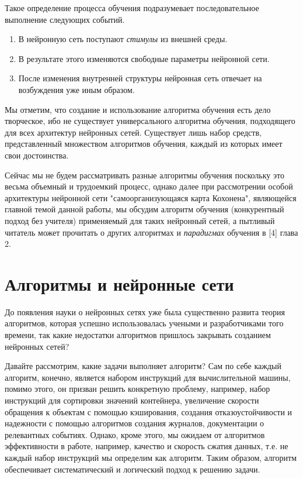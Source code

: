 \documentclass[a4paper,12pt]{report}
\begin{document}
Такое определение процесса обучения подразумевает последовательное
выполнение следующих событий.
\begin{enumerate}
    \item В нейронную сеть поступают \textit{стимулы} из внешней
        среды.
    \item В результате этого изменяются свободные параметры нейронной
        сети.
    \item После изменения внутренней структуры нейронная сеть отвечает
        на возбуждения уже иным образом.
\end{enumerate}

Мы отметим, что создание и использование алгоритма обучения есть дело
творческое, ибо не существует универсального алгоритма обучения,
подходящего для всех архитектур нейронных сетей. Существует лишь набор
средств, представленный множеством алгоритмов обучения, каждый из
которых имеет свои достоинства.

Сейчас мы не будем рассматривать разные алгоритмы обучения поскольку
это весьма объемный и трудоемкий процесс, однако далее при
рассмотрении особой архитектуры нейронной сети "самоорганизующаяся
карта Кохонена", являющейся главной темой данной работы, мы обсудим
алгоритм обучения (конкурентный подход без учителя) применяемый для
таких нейронный сетей, а пытливый читатель может прочитать о других
алгоритмах и \textit{парадигмах}
обучения в [4] глава 2.

\section{Алгоритмы и нейронные сети}
До появления науки о нейронных сетях уже была существенно развита
теория алгоритмов, которая успешно использовалась учеными и
разработчиками того времени, так какие недостатки алгоритмов пришлось
закрывать созданием нейронных сетей?

Давайте рассмотрим, какие задачи выполняет алгоритм? Сам по себе
каждый алгоритм, конечно, является набором инструкций для
вычислительной машины, помимо этого, он призван решить конкретную
проблему, например, набор инструкций для сортировки значений
контейнера, увеличение скорости обращения к объектам с помощью
кэширования, создания отказоустойчивости и надежности с помощью
алгоритмов создания журналов, документации о релевантных событиях.
Однако, кроме этого, мы ожидаем от алгоритмов эффективности в работе,
например, качество и скорость сжатия данных, т.е. не каждый набор
инструкций мы определим как алгоритм. Таким образом, алгоритм
обеспечивает систематический и логический подход к решению задачи.
\end{document}
